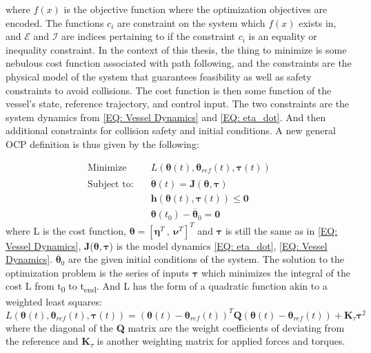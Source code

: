 where $f(x)$ is the objective function where the optimization objectives are encoded.
The functions $c_i$ are constraint on the system which $f(x)$ exists in, and $\mathcal{E}$ and $\mathcal{I}$ are indices
pertaining to if the constraint $c_i$ is an equality or inequality constraint. In the context of this thesis, the thing to minimize is some nebulous cost function
associated with path following, and the constraints are the physical model of the system that guarantees feasibility as well as safety constraints to avoid collisions.
The cost function is then some function of the vessel's state, reference trajectory, and control input. The two constraints are the system dynamics from \eqref{EQ: Vessel Dynamics}
and \eqref{EQ: eta_dot}. And then additional constraints for collision safety and initial conditions. A new general \gls{OCP} definition is thus given by the following:

\begin{subequations}
    \label{EQ :OCP description}
\begin{align}
    \textrm{Minimize} \quad & {L}(\bm{\theta}(t), \bm{\theta}_{ref}(t), \bm{\tau}(t)) \\
    \textrm{Subject to:} \quad & \dot{\bm{\theta}}(t) = \textbf{J}(\bm{\theta}, \bm{\tau}) \\
                         \quad & \textbf{h}(\bm{\theta}(t), \bm{\tau}(t)) \leq \bm{0} \\
                         \quad & \bm{\theta}(t_0) - \overline{\bm{\theta}}_0 = \bm{0}
\end{align}
\end{subequations}
where L is the cost function, $\bm{\theta} = [\bm{\eta}^T \ , \ \bm{\nu}^T]^T$ and $\bm{\tau}$ is still the same as in \eqref{EQ: Vessel Dynamics}, 
\textbf{J}($\bm{\theta}, \bm{\tau}$) is the model dynamics \eqref{EQ: eta_dot}, \eqref{EQ: Vessel Dynamics}. $\overline{\bm{\theta}}_0$ are the
given initial conditions of the system.
The solution to the optimization problem is the series of inputs $\bm{\tau}$ which minimizes the integral of the cost L 
from t\textsubscript{0} to t\textsubscript{end}. And L has the form of a quadratic function
akin to a weighted least squares: %
\begin{equation}
    L(\bm{\theta}(t), \bm{\theta}_{ref}(t), \bm{\tau}(t)) = (\bm{\theta}(t) - \bm{\theta}_{ref}(t))^T \textbf{Q} (\bm{\theta}(t) - \bm{\theta}_{ref}(t)) + \textbf{K}_\tau \bm{\tau}^2
\end{equation}
where the diagonal of the \textbf{Q} matrix are the weight coefficients of deviating from the reference
and \textbf{K}\textsubscript{$\tau$} is another weighting matrix for applied forces and torques.


